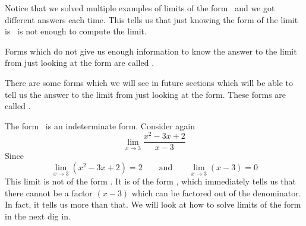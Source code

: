 \documentclass{ximera}
\begin{document}
Notice that we solved multiple examples of limits of the form
\zeroOverZero\ and we got different answers each time.  This tells us
that just knowing the form of the limit is \zeroOverZero\ is not enough
to compute the limit.

\begin{definition}
Forms which do not give us enough information to know the answer to
the limit from just looking at the form are called .

There are some forms which we will see in future sections which will
be able to tell us the answer to the limit from just looking at the
form. These forms are called .
\end{definition}  

The form \zeroOverZero\ is an indeterminate form.  Consider again
\[
\lim_{x\to 3}\frac{x^2-3x+2}{x-3} 
\]
Since
\[
\lim_{x\to3}\left(x^2-3x+2\right) = 2 \qquad\text{and}\qquad  \lim_{x\to3}\left(x-3\right) = 0
\]
This limit is not of the form \zeroOverZero. It is of the form
\numOverZero, which immediately tells us that there cannot be a factor
$(x-3)$ which can be factored out of the denominator.  In fact, it
tells us more than that.  We will look at how to solve limits of the
form \numOverZero in the next dig in.
\end{document}
